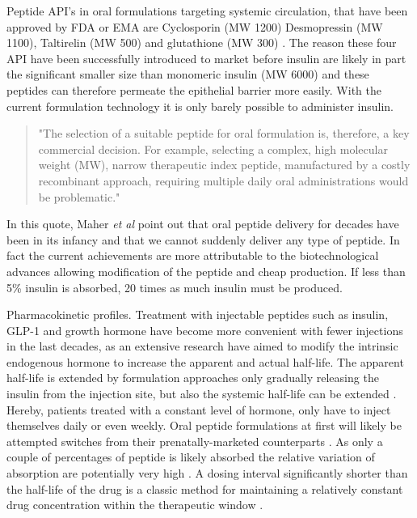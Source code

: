 Peptide API's in oral formulations targeting systemic circulation, that have been approved by FDA or EMA are Cyclosporin (MW 1200) Desmopressin (MW 1100), Taltirelin (MW 500) and glutathione (MW 300) \cite{aguirre2016current}. The reason these four API have been successfully introduced to market before insulin are likely in part the significant smaller size than monomeric insulin (MW 6000) and these peptides can therefore permeate the epithelial barrier more easily. With the current formulation technology it is only barely possible to administer insulin.
\begin{quote}
"The selection of a suitable peptide for oral formulation is, therefore, a key commercial decision. For example, selecting a complex, high molecular weight (MW), narrow therapeutic index peptide, manufactured by a costly recombinant approach, requiring multiple daily oral administrations would be problematic."
\cite{maher2014formulation}
\end{quote}

In this quote, Maher \textit{et al} point out that oral peptide delivery for decades have been in its infancy and that we cannot suddenly deliver any type of peptide. In fact the current achievements are more attributable to the biotechnological advances allowing modification of the peptide and cheap production. If less than 5\% insulin is absorbed, 20 times as much insulin must be produced.

Pharmacokinetic profiles. Treatment with injectable peptides such as insulin, GLP-1 and growth hormone have become more convenient with fewer injections in the last decades, as an extensive research have aimed to modify the intrinsic endogenous hormone to increase the apparent and actual half-life. The apparent half-life is extended by formulation approaches  only gradually releasing the insulin from the injection site, but also the systemic half-life can be extended \cite{arnolds2010pharmacokinetic}.  Hereby, patients treated with a constant level of hormone, only have to inject themselves daily or even weekly. Oral peptide formulations at first will likely be attempted switches from their prenatally-marketed counterparts \cite{maher2014formulation}. As only a couple of percentages of peptide is likely absorbed the relative variation of absorption are potentially very high \cite{gabor2010improving}. A dosing interval significantly shorter than the half-life of the drug is a classic method for maintaining a relatively constant drug concentration within the therapeutic window \cite{tozer2006introduction}.


